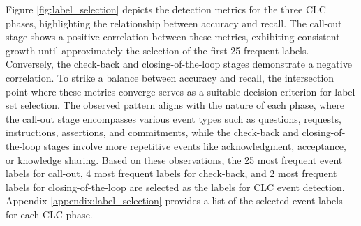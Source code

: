 \documentclass[11pt]{article}
\begin{document}
Figure \ref{fig:label_selection} depicts the detection metrics for the three CLC phases, highlighting the relationship between accuracy and recall. The call-out stage shows a positive correlation between these metrics, exhibiting consistent growth until approximately the selection of the first 25 frequent labels. Conversely, the check-back and closing-of-the-loop stages demonstrate a negative correlation. To strike a balance between accuracy and recall, the intersection point where these metrics converge serves as a suitable decision criterion for label set selection. The observed pattern aligns with the nature of each phase, where the call-out stage encompasses various event types such as questions, requests, instructions, assertions, and commitments, while the check-back and closing-of-the-loop stages involve more repetitive events like acknowledgment, acceptance, or knowledge sharing. Based on these observations, the 25 most frequent event labels for call-out, 4 most frequent labels for check-back, and 2 most frequent labels for closing-of-the-loop are selected as the labels for CLC event detection. Appendix \ref{appendix:label_selection} provides a list of the selected event labels for each CLC phase.
\end{document}
